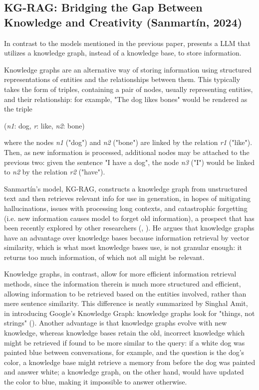 \subsection{KG-RAG: Bridging the Gap Between Knowledge and Creativity (Sanmartín, 2024)}

In contrast to the models mentioned in the previous paper, \cite{Sanmartin2024} presents a LLM that utilizes a knowledge graph, instead of a knowledge base, to store information.

Knowledge graphs are an alternative way of storing information using structured representations of entities and the relationships between them. This typically takes the form of triples, containing a pair of nodes, usually representing entities, and their relationship: for example, "The dog likes bones" would be rendered as the triple
	
\begin{displayquote}
(\textit{n1}: dog, \textit{r}: like, \textit{n2}: bone)
\end{displayquote}
	
\noindent where the nodes \textit{n1} ("dog") and \textit{n2} ("bone") are linked by the relation \textit{r1} ("like"). Then, as new information is processed, additional nodes may be attached to the previous two: given the sentence "I have a dog", the node \textit{n3} ("I") would be linked to \textit{n2} by the relation \textit{r2} ("have").

Sanmartín's model, KG-RAG, constructs a knowledge graph from unstructured text and then retrieves relevant info for use in generation, in hopes of mitigating hallucinations, issues with processing long contexts, and catastrophic forgetting (i.e. new information causes model to forget old information), a prospect that has been recently explored by other researchers (\cite{Guan2023}, \cite{Yang2024}). He argues that knowledge graphs have an advantage over knowledge bases because information retrieval by vector similarity, which is what most knowledge bases use, is not granular enough: it returns too much information, of which not all might be relevant.
	
Knowledge graphs, in contrast, allow for more efficient information retrieval methods, since the information therein is much more structured and efficient, allowing information to be retrieved based on the entities involved, rather than mere sentence similarity. This difference is neatly summarized by Singhal Amit, in introducing Google's Knowledge Graph: knowledge graphs look for "things, not strings" (\cite{Singhal2012}). Another advantage is that knowledge graphs evolve with new knowledge, whereas knowledge bases retain the old, incorrect knowledge which might be retrieved if found to be more similar to the query: if a white dog was painted blue between conversations, for example, and the question is the dog's color, a knowledge base might retrieve a memory from before the dog was painted and answer white; a knowledge graph, on the other hand, would have updated the color to blue, making it impossible to answer otherwise.
	
